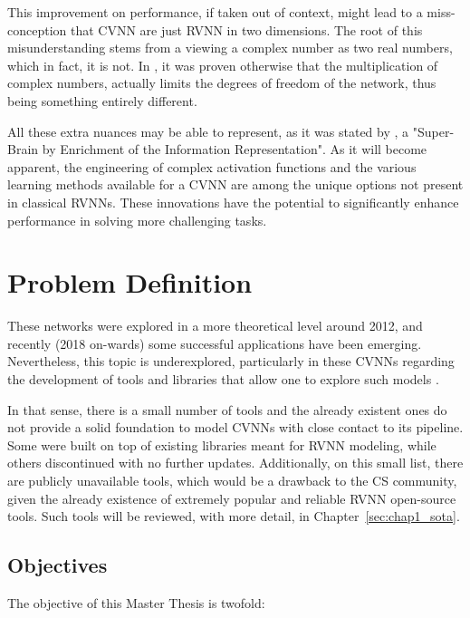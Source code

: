 This improvement on performance, if taken out of context, might lead to a miss-conception that \gls{CVNN} are just \gls{RVNN} in two dimensions. The root of this misunderstanding stems from a viewing a complex number as two real numbers, which in fact, it is not. In \parencite{hirose2012coherwave}, it was proven otherwise that the multiplication of complex numbers, actually limits the degrees of freedom of the network, thus being something entirely different.

All these extra nuances may be able to represent, as it was stated by \textcite{hirose2012complex}, a "Super-Brain by Enrichment of the Information Representation". As it will become apparent, the engineering of complex activation functions and the various learning methods available for a CVNN are among the unique options not present in classical RVNNs. These innovations have the potential to significantly enhance performance in solving more challenging tasks.

\section{Problem Definition}
\label{sec:chap1_definition}

These networks were explored in a more theoretical level around 2012, and recently (2018 on-wards) some successful applications have been emerging. Nevertheless, this topic is underexplored, particularly in these CVNNs regarding the development of tools and libraries that allow one to explore such models \parencite{bassey2021survey}.

In that sense, there is a small number of tools and the already existent ones do not provide a solid foundation to model \gls{CVNN}s with close contact to its pipeline. Some were built on top of existing libraries meant for \gls{RVNN} modeling, while others discontinued with no further updates. Additionally, on this small list, there are publicly unavailable tools, which would be a drawback to the \gls{CS} community, given the already existence of extremely popular and reliable \gls{RVNN} open-source tools. Such tools will be reviewed, with more detail, in Chapter~\ref{sec:chap1_sota}.

\subsection{Objectives}

The objective of this Master Thesis is twofold:

